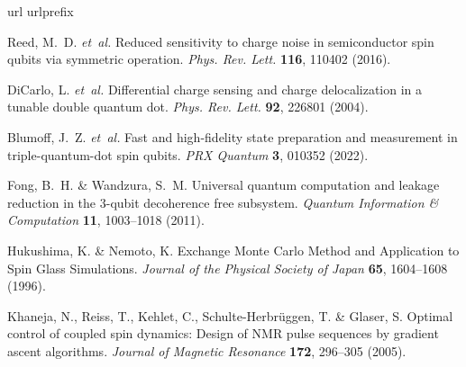 \documentclass[aps,prl,twocolumn,superscriptaddress,nobibnotes,10pt,floatfix]{revtex4-2}
\def\bibcommenthead{}
\begin{document}
\begin{thebibliography}{10}
	\expandafter\ifx\csname url\endcsname\relax
	\def\url#1{\burl{#1}}\fi
	\expandafter\ifx\csname urlprefix\endcsname\relax\def\urlprefix{URL }\fi
	\providecommand{\bibinfo}[2]{#2}
	\providecommand{\eprint}[2][]{\url{#2}}
	\providecommand{\doi}[1]{\url{https://doi.org/#1}}
	\bibcommenthead

	\bibinfo{author}{Reed, M.~D.} \emph{et~al.}
	\newblock \bibinfo{title}{Reduced sensitivity to charge noise in semiconductor
		spin qubits via symmetric operation}.
	\newblock \emph{\bibinfo{journal}{Phys. Rev. Lett.}}
	\textbf{\bibinfo{volume}{116}}, \bibinfo{pages}{110402}
	(\bibinfo{year}{2016}).

	\bibinfo{author}{DiCarlo, L.} \emph{et~al.}
	\newblock \bibinfo{title}{Differential charge sensing and charge delocalization
		in a tunable double quantum dot}.
	\newblock \emph{\bibinfo{journal}{Phys. Rev. Lett.}}
	\textbf{\bibinfo{volume}{92}}, \bibinfo{pages}{226801}
	(\bibinfo{year}{2004}).

	\bibinfo{author}{Blumoff, J.~Z.} \emph{et~al.}
	\newblock \bibinfo{title}{Fast and high-fidelity state preparation and
		measurement in triple-quantum-dot spin qubits}.
	\newblock \emph{\bibinfo{journal}{PRX Quantum}} \textbf{\bibinfo{volume}{3}},
	\bibinfo{pages}{010352} (\bibinfo{year}{2022}).

	\bibinfo{author}{Fong, B.~H.} \& \bibinfo{author}{Wandzura, S.~M.}
	\newblock \bibinfo{title}{Universal quantum computation and leakage reduction
		in the 3-qubit decoherence free subsystem}.
	\newblock \emph{\bibinfo{journal}{Quantum Information \& Computation}}
	\textbf{\bibinfo{volume}{11}}, \bibinfo{pages}{1003--1018}
	(\bibinfo{year}{2011}).

	\bibinfo{author}{Hukushima, K.} \& \bibinfo{author}{Nemoto, K.}
	\newblock \bibinfo{title}{Exchange {Monte} {Carlo} {Method} and {Application}
		to {Spin} {Glass} {Simulations}}.
	\newblock \emph{\bibinfo{journal}{Journal of the Physical Society of Japan}}
	\textbf{\bibinfo{volume}{65}}, \bibinfo{pages}{1604--1608}
	(\bibinfo{year}{1996}).

	\bibinfo{author}{Khaneja, N.}, \bibinfo{author}{Reiss, T.},
	\bibinfo{author}{Kehlet, C.}, \bibinfo{author}{Schulte-Herbrüggen, T.} \&
	\bibinfo{author}{Glaser, S.}
	\newblock \bibinfo{title}{Optimal control of coupled spin dynamics: {Design} of
		{NMR} pulse sequences by gradient ascent algorithms}.
	\newblock \emph{\bibinfo{journal}{Journal of Magnetic Resonance}}
	\textbf{\bibinfo{volume}{172}}, \bibinfo{pages}{296--305}
	(\bibinfo{year}{2005}).


\end{thebibliography}
\end{document}

